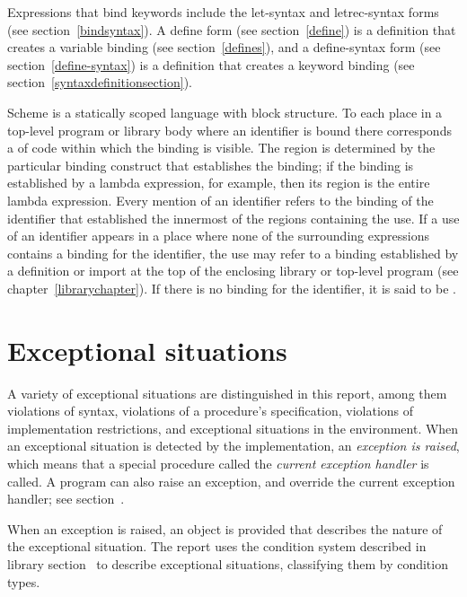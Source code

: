 Expressions that bind keywords include the {\cf
  let-syntax} and {\cf letrec-syntax} forms (see
section~\ref{bindsyntax}).  A {\cf define} form (see section~\ref{define}) is a
definition that creates a variable binding (see 
section~\ref{defines}), and a {\cf define-syntax} form (see
section~\ref{define-syntax}) is
a definition that creates a keyword binding (see
section~\ref{syntaxdefinitionsection}).

\vest Scheme is a statically scoped language with
block structure.  To each place in a top-level program or library body where an identifier is bound 
there corresponds a  of code within which
the binding is visible.  The region is determined by the particular
binding construct that establishes the binding; if the binding is
established by a {\cf lambda} expression, for example, then its region
is the entire {\cf lambda} expression.  Every mention of an identifier
refers to the binding of the identifier that established the
innermost of the regions containing the use.  If a use of an
identifier appears in a place where none of the surrounding expressions
contains a binding for the identifier, the use may refer to a
binding established by a definition or import at the top of the
enclosing library or top-level program
(see chapter~\ref{librarychapter}).
If there is no binding for the identifier,
it is said to be .

\section{Exceptional situations}
\label{exceptionalsituationsection}

A variety of exceptional situations
are distinguished in this report, among them violations of syntax,
violations of a procedure's specification, violations of
implementation restrictions, and exceptional situations in the
environment.  When an exceptional situation is detected by the
implementation, an \textit{exception is raised},
which means that a special procedure called the \textit{current
  exception handler} is called.  A program can also raise an
exception, and override the current exception handler; see
section~.

When an exception is raised, an object is provided that
describes the nature of the exceptional situation.  The report uses
the condition system described in library section~ to
describe exceptional situations, classifying them by condition types.

